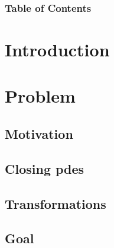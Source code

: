 \documentclass[10pt]{beamer}
\title[University of Wisconsin Milwaukee]{\mytitle}
\author[\myauthor]{\myauthor}
\institute[]{University of Wisconsin Milwaukee}
\date[\textcolor{white}{05/03/2024}]{05/03/2024}
\begin{document}
    \frame{\titlepage}
    \begin{frame}
        \frametitle{Table of Contents}
        \tableofcontents
    \end{frame}


    \section{Introduction}\label{sec:introduction}
    \begin{frame}{}

    \end{frame}


    \section{Problem}\label{sec:problem}

    \begin{frame}{}

    \end{frame}

    \subsection{Motivation}\label{subsec:motivation}

    \begin{frame}{}

    \end{frame}

    \subsection{Closing pdes}\label{subsec:closing-pdes}

    \begin{frame}{}

    \end{frame}

    \subsection{Transformations}\label{subsec:transformations}

    \begin{frame}{}

    \end{frame}

    \subsection{Goal}\label{subsec:goal}
\end{document}
